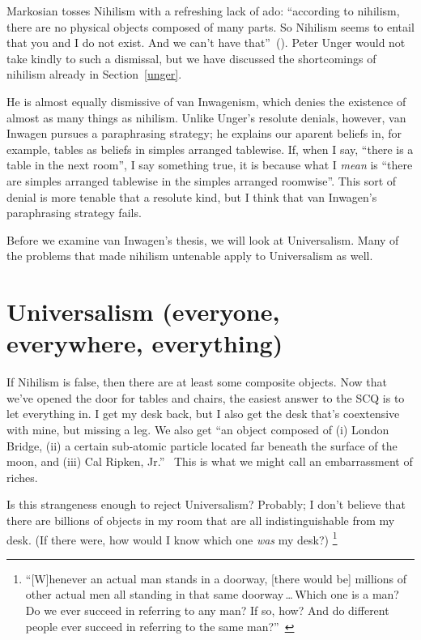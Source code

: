 \documentclass[11pt]{article}
\begin{document}
\begin{spacing}{1.5}
Markosian tosses Nihilism with a refreshing lack of ado: ``according to nihilism, there are no physical objects composed of many parts. So Nihilism seems to entail that you and I do not exist. And we can't have that''~(\citeyear[220]{markosian1998a}). Peter Unger would not take kindly to such a dismissal, but we have discussed the shortcomings of nihilism already in Section~\ref{unger}.

He is almost equally dismissive of van Inwagenism, which denies the existence of almost as many things as nihilism. Unlike Unger's resolute denials, however, van Inwagen pursues a paraphrasing strategy; he explains our aparent beliefs in, for example, tables as beliefs in simples arranged tablewise. If, when I say, ``there is a table in the next room'', I say something true, it is because what I {\em mean} is ``there are simples arranged tablewise in the simples arranged roomwise''. This sort of denial is more tenable that a resolute kind, but I think that van Inwagen's paraphrasing strategy fails.

Before we examine van Inwagen's thesis, we will look at Universalism. Many of the problems that made nihilism untenable apply to Universalism as well.

\section{Universalism (everyone, everywhere, everything)}
If Nihilism is false, then there are at least some composite objects. Now that we've opened the door for tables and chairs, the easiest answer to the SCQ is to let everything in. I get my desk back, but I also get the desk that's coextensive with mine, but missing a leg. We also get ``an object composed of (i) London Bridge, (ii) a certain sub-atomic particle located far beneath the surface of the moon, and (iii) Cal Ripken, Jr.''~\citep[228]{markosian1998a} %
This is what we might call an embarrassment of riches.

Is this strangeness enough to reject Universalism? Probably; I don't believe that there are billions of objects in my room that are all indistinguishable from my desk. (If there were, how would I know which one {\em was} my desk?)%
\footnote{``[W]henever an actual man stands in a doorway, [there would be] millions of other actual men all standing in that same doorway\,\ldots\,Which one is a man? Do we ever succeed in referring to any man? If so, how? And do different people ever succeed in referring to the same man?''~\citep[241--242]{markosian1998a}}


\end{spacing}
\end{document}
